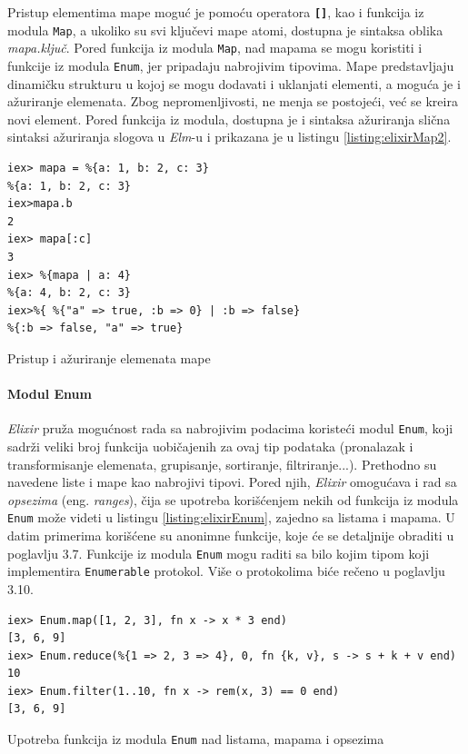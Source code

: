 \documentclass[12pt,oneside]{memoir}
\begin{document}
Pristup elementima mape moguć je pomoću operatora \texttt{\textbf{[\smallskip]}}, kao i
funkcija iz modula \texttt{Map}, a ukoliko su svi ključevi mape atomi, dostupna je 
sintaksa oblika \emph{mapa.ključ}. Pored funkcija iz modula \texttt{Map}, nad mapama se
mogu koristiti i funkcije iz modula \texttt{Enum}, jer pripadaju nabrojivim tipovima.
Mape predstavljaju dinamičku strukturu u kojoj se mogu dodavati i uklanjati elementi,
a moguća je i ažuriranje elemenata. Zbog nepromenljivosti, ne menja se postojeći, već se
kreira novi element. Pored funkcija iz modula, dostupna je i sintaksa ažuriranja slična 
sintaksi ažuriranja slogova u \emph{Elm}-u i prikazana je u listingu \ref{listing:elixirMap2}. 
\begin{listing}[!h]
\begin{verbatim}
iex> mapa = %{a: 1, b: 2, c: 3}
%{a: 1, b: 2, c: 3}
iex>mapa.b
2
iex> mapa[:c]
3
iex> %{mapa | a: 4}
%{a: 4, b: 2, c: 3}
iex>%{ %{"a" => true, :b => 0} | :b => false}
%{:b => false, "a" => true}
\end{verbatim}
\caption{Pristup i ažuriranje elemenata mape}
\label{listing:elixirMap2}
\end{listing}
\paragraph{Modul Enum}
\emph{Elixir} pruža mogućnost rada sa nabrojivim podacima koristeći modul \texttt{Enum}, koji sadrži
veliki broj funkcija uobičajenih za ovaj tip podataka (pronalazak i transformisanje elemenata,
grupisanje, sortiranje, filtriranje...). Prethodno su navedene liste i mape kao nabrojivi tipovi.
Pored njih, \emph{Elixir} omogućava i rad sa \emph{opsezima} (eng. \emph{ranges}), čija se
upotreba korišćenjem nekih od funkcija iz modula \texttt{Enum} može videti u listingu
\ref{listing:elixirEnum}, zajedno sa listama i mapama. U datim primerima korišćene su anonimne
funkcije, koje će se detaljnije obraditi u poglavlju 3.7. Funkcije iz modula \texttt{Enum}
mogu raditi sa bilo kojim tipom koji implementira \texttt{Enumerable} protokol. Više
o protokolima biće rečeno u poglavlju 3.10.
\begin{listing}[!ht]
\begin{verbatim}
iex> Enum.map([1, 2, 3], fn x -> x * 3 end)
[3, 6, 9]
iex> Enum.reduce(%{1 => 2, 3 => 4}, 0, fn {k, v}, s -> s + k + v end)
10
iex> Enum.filter(1..10, fn x -> rem(x, 3) == 0 end)
[3, 6, 9]
\end{verbatim}
\caption{Upotreba funkcija iz modula \texttt{Enum} nad listama, mapama i opsezima}
\label{listing:elixirEnum}
\end{listing}
\end{document}
